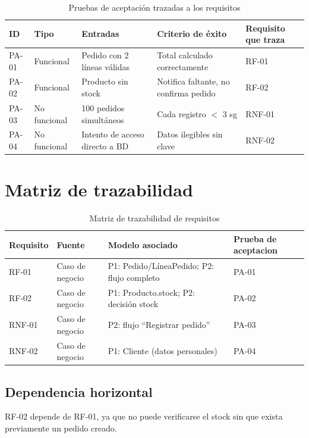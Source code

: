 \documentclass[11pt,a4paper]{article}
\begin{document}
\begin{table}[h!]
\centering
\small
\begin{tabular}{lllll}
\toprule
\textbf{ID} & \textbf{Tipo} & \textbf{Entradas} & \textbf{Criterio de éxito} & \textbf{Requisito que traza} \\
\midrule
PA-01 & Funcional     & Pedido con 2 líneas válidas    & Total calculado correctamente          & RF-01 \\
PA-02 & Funcional     & Producto sin stock             & Notifica faltante, no confirma pedido  & RF-02 \\
PA-03 & No funcional  & 100 pedidos simultáneos        & Cada registro $<$ 3 sg                  & RNF-01 \\
PA-04 & No funcional  & Intento de acceso directo a BD & Datos ilegibles sin clave              & RNF-02 \\
\bottomrule
\end{tabular}
\caption{Pruebas de aceptación trazadas a los requisitos}
\end{table}

\section{Matriz de trazabilidad}

\begin{table}[h!]
\centering
\small
\begin{tabular}{lp{2.3cm}p{5.2cm}l}
\toprule
\textbf{Requisito} & \textbf{Fuente} & \textbf{Modelo asociado} & \textbf{Prueba de aceptacion} \\
\midrule
RF-01  & Caso de negocio & P1: Pedido/LíneaPedido; P2: flujo completo & PA-01 \\
RF-02  & Caso de negocio & P1: Producto.stock; P2: decisión stock     & PA-02 \\
RNF-01 & Caso de negocio & P2: flujo ``Registrar pedido''             & PA-03 \\
RNF-02 & Caso de negocio & P1: Cliente (datos personales)             & PA-04 \\
\bottomrule
\end{tabular}
\caption{Matriz de trazabilidad de requisitos}
\end{table}

\subsection*{Dependencia horizontal}
RF-02 depende de RF-01, ya que no puede verificarse el stock sin que exista previamente un
pedido creado.
\end{document}
